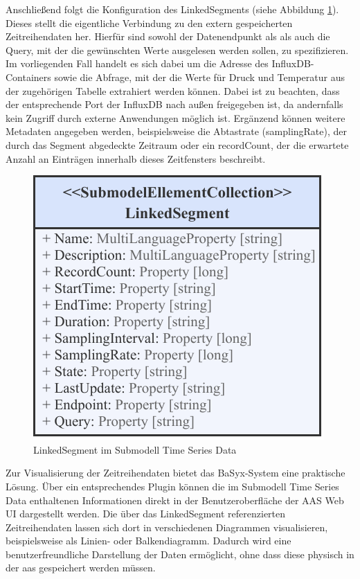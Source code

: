 Anschließend folgt die Konfiguration des LinkedSegments (siehe Abbildung \ref{fig:LinkedSegmentTimeSeries}). 
Dieses stellt die eigentliche Verbindung zu den extern gespeicherten Zeitreihendaten her.
Hierfür sind sowohl der Datenendpunkt als als auch die Query, mit der die gewünschten Werte ausgelesen werden sollen, zu spezifizieren.
Im vorliegenden Fall handelt es sich dabei um die Adresse des InfluxDB-Containers sowie die Abfrage, mit der die Werte für Druck und Temperatur aus der zugehörigen Tabelle extrahiert werden können.
Dabei ist zu beachten, dass der entsprechende Port der InfluxDB nach außen freigegeben ist, da andernfalls kein Zugriff durch externe Anwendungen möglich ist.
Ergänzend können weitere Metadaten angegeben werden, beispielsweise die Abtastrate (samplingRate), der durch das Segment abgedeckte Zeitraum oder ein recordCount, der die erwartete Anzahl an Einträgen innerhalb dieses Zeitfensters beschreibt.

\begin{figure}[htbp]
    \centering
    \includegraphics{Bilder/TimeSeries/LinkedSegment.pdf}
    \caption{LinkedSegment im Submodell Time Series Data}
    \label{fig:LinkedSegmentTimeSeries}
\end{figure}

Zur Visualisierung der Zeitreihendaten bietet das BaSyx-System eine praktische Lösung.
Über ein entsprechendes Plugin können die im Submodell Time Series Data enthaltenen Informationen direkt in der Benutzeroberfläche der AAS Web UI dargestellt werden.
Die über das LinkedSegment referenzierten Zeitreihendaten lassen sich dort in verschiedenen Diagrammen visualisieren, beispielsweise als Linien- oder Balkendiagramm.
Dadurch wird eine benutzerfreundliche Darstellung der Daten ermöglicht, ohne dass diese physisch in der \acs{aas} gespeichert werden müssen.

